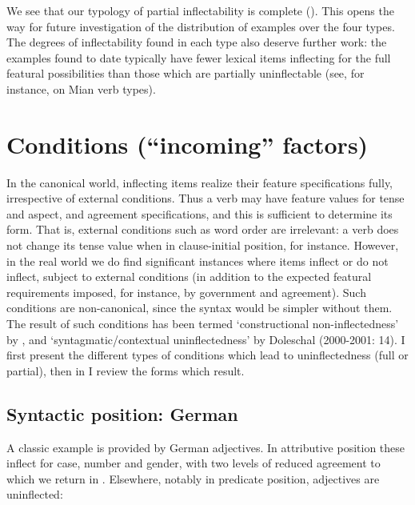 \documentclass[output=paper]{langscibook}
\begin{document}
We see that our typology of partial inflectability is complete (). This opens the way for future investigation of the distribution of examples over the four types. The degrees of inflectability found in each type also deserve further work: the examples found to date typically have fewer lexical items inflecting for the full featural possibilities than those which are partially uninflectable (see, for instance,  on Mian verb types). 

\section{\textbf{Conditions} \textbf{(“incoming”} \textbf{factors)}}

In the canonical world, inflecting items realize their feature specifications fully, irrespective of external conditions. Thus a verb may have feature values for tense and aspect, and agreement specifications, and this is sufficient to determine its form. That is, external conditions such as word order are irrelevant: a verb does not change its tense value when in clause-initial position, for instance. However, in the real world we do find significant instances where items inflect or do not inflect, subject to external conditions (in addition to the expected featural requirements imposed, for instance, by government and agreement). Such conditions are non-canonical, since the syntax would be simpler without them. The result of such conditions has been termed ‘constructional non-inflectedness’ by \citet[144]{Spencer2020}, and ‘syntagmatic/contextual uninflectedness’ by Doleschal (2000-2001: 14). I first present the different types of conditions which lead to uninflectedness (full or partial), then in  I review the forms which result. 

\subsection{\textbf{Syntactic} \textbf{position:} \textbf{German}}

A classic example is provided by German adjectives. In attributive position these inflect for case, number and gender, with two levels of reduced agreement \citep[95-96]{Corbett2006} to which we return in . Elsewhere, notably in predicate position, adjectives are uninflected:

\ea%
    \label{ex:key:13}
    \gll \\
         \\
    \glt
    \z %
\end{document}
